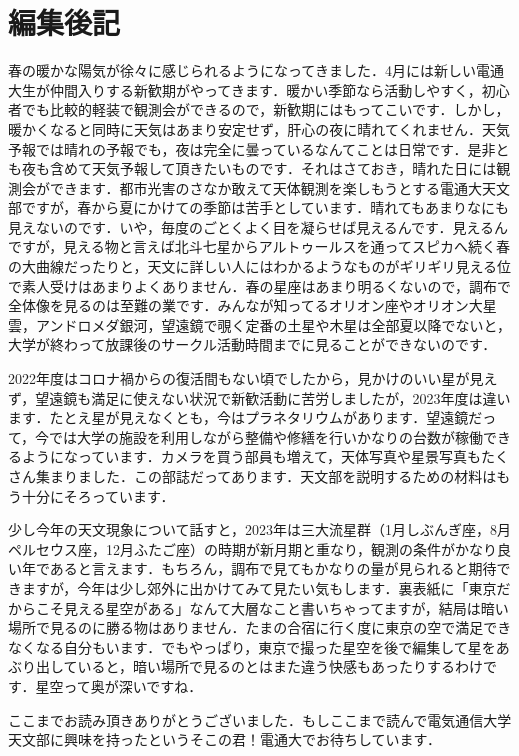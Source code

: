 \documentclass[../../super_nova_2023]{subfiles}
\begin{document}
\chapter{編集後記}
\vspace{2\zw}
春の暖かな陽気が徐々に感じられるようになってきました．4月には新しい電通大生が仲間入りする新歓期がやってきます．暖かい季節なら活動しやすく，初心者でも比較的軽装で観測会ができるので，新歓期にはもってこいです．しかし，暖かくなると同時に天気はあまり安定せず，肝心の夜に晴れてくれません．天気予報では晴れの予報でも，夜は完全に曇っているなんてことは日常です．是非とも夜も含めて天気予報して頂きたいものです．それはさておき，晴れた日には観測会ができます．都市光害のさなか敢えて天体観測を楽しもうとする電通大天文部ですが，春から夏にかけての季節は苦手としています．晴れてもあまりなにも見えないのです．いや，毎度のごとくよく目を凝らせば見えるんです．見えるんですが，見える物と言えば北斗七星からアルトゥールスを通ってスピカへ続く春の大曲線だったりと，天文に詳しい人にはわかるようなものがギリギリ見える位で素人受けはあまりよくありません．春の星座はあまり明るくないので，調布で全体像を見るのは至難の業です．みんなが知ってるオリオン座やオリオン大星雲，アンドロメダ銀河，望遠鏡で覗く定番の土星や木星は全部夏以降でないと，大学が終わって放課後のサークル活動時間までに見ることができないのです．

2022年度はコロナ禍からの復活間もない頃でしたから，見かけのいい星が見えず，望遠鏡も満足に使えない状況で新歓活動に苦労しましたが，2023年度は違います．たとえ星が見えなくとも，今はプラネタリウムがあります．望遠鏡だって，今では大学の施設を利用しながら整備や修繕を行いかなりの台数が稼働できるようになっています．カメラを買う部員も増えて，天体写真や星景写真もたくさん集まりました．この部誌だってあります．天文部を説明するための材料はもう十分にそろっています．

少し今年の天文現象について話すと，2023年は三大流星群（1月しぶんぎ座，8月ペルセウス座，12月ふたご座）の時期が新月期と重なり，観測の条件がかなり良い年であると言えます．もちろん，調布で見てもかなりの量が見られると期待できますが，今年は少し郊外に出かけてみて見たい気もします．裏表紙に「東京だからこそ見える星空がある」なんて大層なこと書いちゃってますが，結局は暗い場所で見るのに勝る物はありません．たまの合宿に行く度に東京の空で満足できなくなる自分もいます．でもやっぱり，東京で撮った星空を後で編集して星をあぶり出していると，暗い場所で見るのとはまた違う快感もあったりするわけです．星空って奥が深いですね．

ここまでお読み頂きありがとうございました．もしここまで読んで電気通信大学天文部に興味を持ったというそこの君！電通大でお待ちしています．
\end{document}
